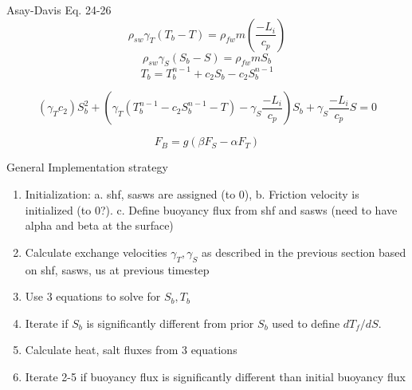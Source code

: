 \documentclass[letterpaper,10pt]{report}
\newcommand{\code}[1]{\texttt{#1}} %
\begin{document}
	Asay-Davis Eq. 24-26
	\begin{equation}
	\rho_{sw} \gamma_T (T_b-T) = \rho_{fw} m(\frac{-L_i}{c_p})
	\end{equation}
	\begin{equation}
	\rho_{sw} \gamma_S (S_b-S) = \rho_{fw} m S_b
	\end{equation}
	\begin{equation}
	T_b = T_b^{n-1}+c_2 S_b - c_2 S_b^{n-1}
	\end{equation}
	
	\begin{equation}
	(\gamma_T c_2) S_b^2 + (\gamma_T(T_b^{n-1}-c_2 S_b^{n-1}-T)-\gamma_S \frac{-L_i}{c_p})S_b + \gamma_S\frac{-L_i}{c_p}S=0
	\end{equation}
	
	
	
	
	
	\begin{equation}
	F_B = g(\beta F_S - \alpha F_T)
	\end{equation}
	
	
	General Implementation strategy
	\begin{enumerate}
		\item Initialization: 
		a. shf, sasws are assigned (to 0), 
		b. Friction velocity is initialized (to 0?). 
		c. Define buoyancy flux from shf and sasws 
			(need to have alpha and beta at the surface)
		\item Calculate exchange velocities $\gamma_T,\gamma_S$ as described in the previous section based on shf, sasws, us at previous timestep
		\item Use 3 equations to solve for $S_b, T_b$
		\item Iterate if $S_b$ is significantly different from prior $S_b$ used to define $dT_f/dS$.
		\item Calculate heat, salt fluxes from 3 equations
		\item Iterate 2-5 if buoyancy flux is significantly different than initial buoyancy flux
	\end{enumerate}
\end{document}
